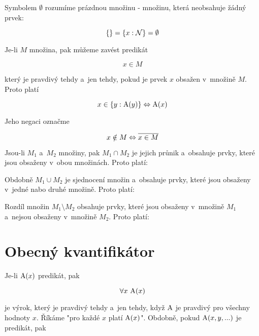 Symbolem \(\emptyset\) rozumíme prázdnou množinu - množinu, která neobsahuje žádný prvek:

\begin{equation}
\{\} = \{x: \mathcal{N}\} = \emptyset
\end{equation}

Je-li \(M\) množina, pak můžeme zavést predikát

\begin{equation}
x \in M
\end{equation}

který je pravdivý tehdy a~jen tehdy, pokud je prvek \(x\) obsažen v~množině \(M\). Proto platí

\begin{equation}
x \in \{ y : \mathrm{A}(y) \} \Leftrightarrow \mathrm{A}(x)
\end{equation}

Jeho negaci označme

\begin{equation}
x \notin M \Leftrightarrow \overline{x \in M}
\end{equation}


Jsou-li \(M_1\) a~\(M_2\) množiny, pak \(M_1 \cap M_2\) je jejich průnik a~obsahuje prvky, které jsou obsaženy v~obou množinách. Proto platí:


Obdobně \(M_1 \cup M_2\) je sjednocení množin a~obsahuje prvky, které jsou obsaženy v~jedné nabo druhé množině. Proto platí:


Rozdíl množin \(M_1 \setminus M_2\) obsahuje prvky, které jsou obsaženy v~množině \(M_1\) a~nejsou obsaženy v~množině \(M_2\). Proto platí:


\section{Obecný kvantifikátor}

Je-li \(\mathrm{A}(x)\) predikát, pak

\begin{equation}
\forall x \ \predicate{A}(x)
\end{equation}

je výrok, který je pravdivý tehdy a~jen tehdy, když \(\mathrm{A}\) je pravdivý pro všechny hodnoty \(x\). Říkáme "pro každé \(x\) platí \(\mathrm{A}(x)\)". Obdobně, pokud \(\mathrm{A}(x, y, ...)\) je predikát, pak

